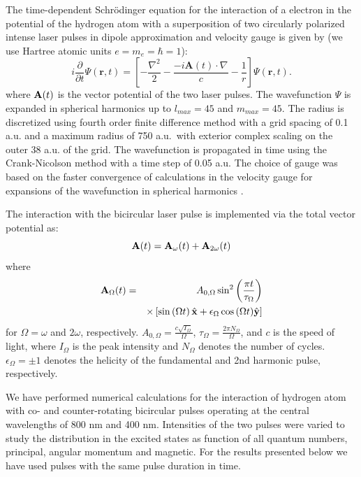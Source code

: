 The time-dependent Schr\"odinger equation for the interaction of a electron in the potential of the hydrogen atom with a superposition of two circularly polarized intense laser pulses in dipole approximation and velocity gauge is given by (we use Hartree atomic units $e = m_e = \hbar =1$): 
%
\begin{equation}
i\frac{\partial}{\partial t}\Psi(\mathbf{r},t) = \left[-\frac{\nabla^2}{2} - \frac{-i\mathbf{A}(t) \cdot \nabla}{c}  - \frac{1}{r} \right]\Psi(\mathbf{r},t).
\end{equation}
%
where ${\bf A}(t)$ is the vector potential of the two laser pulses. The wavefunction $\Psi$ is expanded in spherical harmonics up to $l_{max} = 45$ and  $m_{max} = 45$. The radius is discretized using fourth order finite difference method with a grid spacing of 0.1 a.u. and a maximum radius of 750 a.u.\ with exterior complex scaling on the outer 38 a.u. of the grid. The wavefunction is propagated in time using the Crank-Nicolson method with a time step of 0.05 a.u. The choice of gauge was based on the faster convergence of calculations in the velocity gauge for expansions of the wavefunction in spherical harmonics \cite{cormier96,han10}. 

The interaction with the bicircular laser pulse is implemented via the total vector potential as:
\begin{equation}
{\bf A}(t) = {\bf A}_{\omega}(t) + {\bf A}_{2\omega}(t)
\end{equation}
where
\begin{eqnarray}
{\bf A}_\Omega(t) &=& A_{0,\Omega} \sin^2\left(\frac{\pi t}{\tau_{\Omega}}\right)
    \nonumber
      \\
      && \times \left[ 
      \sin\left(\Omega t \right) {\hat{\bf x} + \epsilon_{\Omega}\cos\left(\Omega t \right)} {\hat{\bf y}} \right]
\end{eqnarray}
for $\Omega = \omega$ and $2\omega$, respectively. $A_{0,\Omega} = \frac{c\sqrt{I_\Omega}}{\Omega}$, $\tau_{\Omega} = \frac{2\pi N_{\Omega}}{\Omega}$, and $c$ is the speed of light, where $I_{\Omega}$ is the peak intensity and $N_{\Omega}$ denotes the number of cycles. $\epsilon_{\Omega} = \pm 1$ denotes the helicity of the fundamental and 2nd harmonic pulse, respectively. 


We have performed numerical calculations for the interaction of hydrogen atom with co- and counter-rotating bicircular pulses operating at the central wavelengths of 800 nm and 400 nm. Intensities of the two pulses were varied to study the distribution in the excited states as function of all quantum numbers, principal, angular momentum and magnetic. For the results presented below we have used pulses with the same pulse duration in time.  


